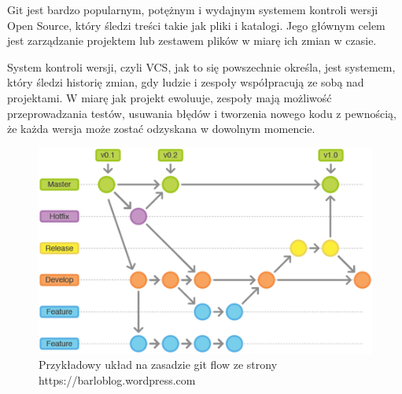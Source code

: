 Git jest bardzo popularnym, potężnym i wydajnym systemem kontroli wersji Open Source, który śledzi treści takie jak pliki i katalogi. Jego głównym celem jest zarządzanie projektem lub zestawem plików w miarę ich zmian w czasie.

System kontroli wersji, czyli VCS, jak to się powszechnie określa, jest systemem, który śledzi historię zmian, gdy ludzie i zespoły współpracują ze sobą nad projektami. W miarę jak projekt ewoluuje, zespoły mają możliwość przeprowadzania testów, usuwania błędów i tworzenia nowego kodu z pewnością, że każda wersja może zostać odzyskana w dowolnym momencie.

\begin{figure}[H]
    \centering
    \includegraphics[width=6in]{images/git.png}
    \caption{Przykładowy układ na zasadzie git flow ze strony https://barloblog.wordpress.com \label{fig:git}}
\end{figure}